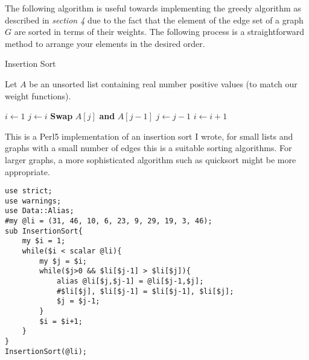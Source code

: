 \documentclass[../main.tex]{subfiles}
\begin{document}
The following algorithm is useful towards implementing the greedy algorithm as described in \textit{section 4} due to the fact that the element of the edge set of a graph $G$ are sorted in terms of their weights. The following process is a straightforward method to arrange your elements in the desired order.

\begin{algorithm}[H]
\caption{Insertion Sort}\label{sorting}
Let $A$ be an unsorted list containing real number positive values (to match our weight functions).
\begin{algorithmic}[1]
\State $i \gets 1$
\State $j \gets i$
	\State  \textbf{Swap} $A[j]$ \textbf{and} $A[j-1]$
	\State $j \gets j-1$	
	\EndWhile
	\State $i \gets i+1$
\EndWhile
\EndProcedure
\end{algorithmic}
\end{algorithm}
This is a Perl5 implementation of an insertion sort I wrote, for small lists and graphs with a small number of edges this is a suitable sorting algorithms. For larger graphs, a more sophisticated algorithm such as quicksort might be more appropriate.
\begin{lstlisting}
use strict;
use warnings;
use Data::Alias;
#my @li = (31, 46, 10, 6, 23, 9, 29, 19, 3, 46);
sub InsertionSort{
	my $i = 1;
	while($i < scalar @li){
		my $j = $i;
		while($j>0 && $li[$j-1] > $li[$j]){
			alias @li[$j,$j-1] = @li[$j-1,$j];
			#$li[$j], $li[$j-1] = $li[$j-1], $li[$j];
			$j = $j-1;
		}
		$i = $i+1;
	}
}
InsertionSort(@li);
\end{lstlisting}
\end{document}
